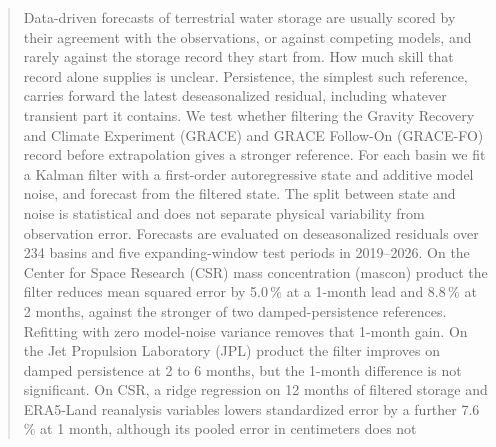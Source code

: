 \documentclass[hess, manuscript]{copernicus}
\begin{document}
\begin{abstract}
Data-driven forecasts of terrestrial water storage are usually scored by
their agreement with the observations, or against competing models,
and rarely against the storage record they start from. How much skill that
record alone supplies is unclear. Persistence, the simplest
such reference, carries forward the latest deseasonalized residual,
including whatever transient part it contains. We test whether filtering the
Gravity Recovery and Climate Experiment (GRACE) and GRACE Follow-On
(GRACE-FO) record
before extrapolation gives a stronger reference. For each basin we fit a
Kalman filter with a first-order autoregressive state and additive
model noise, and forecast from the filtered state. The split between
state and noise is statistical and does not separate physical variability
from observation error. Forecasts are evaluated on deseasonalized residuals over
234 basins and five expanding-window test periods in 2019--2026. On
the Center for Space Research (CSR) mass concentration (mascon) product the filter reduces mean squared error by
5.0\,\% at a 1-month lead and 8.8\,\% at 2 months, against the stronger
of two damped-persistence references.
Refitting with zero model-noise variance removes that 1-month gain.
On the Jet Propulsion Laboratory (JPL) product the filter improves on damped persistence at 2 to 6
months, but the 1-month difference is not significant. On CSR, a ridge
regression on 12 months of filtered storage and ERA5-Land reanalysis variables lowers
standardized error by a further
7.6\,\% at 1 month, although its pooled error in centimeters does not

\end{abstract}
\end{document}

